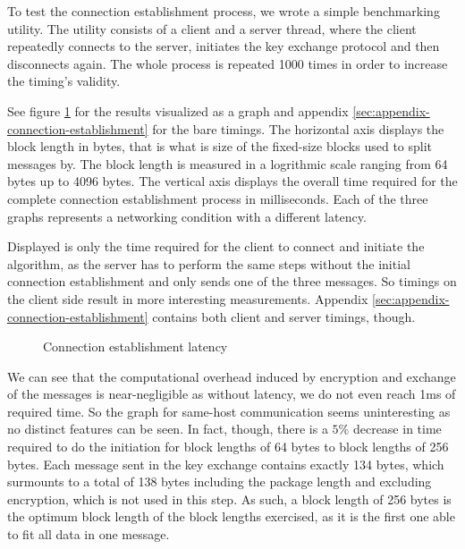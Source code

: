 To test the connection establishment process, we wrote a simple benchmarking utility.
The utility consists of a client and a server thread, where the client repeatedly connects to the server, initiates the key exchange protocol and then disconnects again.
The whole process is repeated 1000 times in order to increase the timing's validity.

See figure \ref{fig:connection-establishment} for the results visualized as a graph and appendix \ref{sec:appendix-connection-establishment} for the bare timings.
The horizontal axis displays the block length in bytes, that is what is size of the fixed-size blocks used to split messages by.
The block length is measured in a logrithmic scale ranging from 64 bytes up to 4096 bytes.
The vertical axis displays the overall time required for the complete connection establishment process in milliseconds.
Each of the three graphs represents a networking condition with a different latency.

Displayed is only the time required for the client to connect and initiate the algorithm, as the server has to perform the same steps without the initial connection establishment and only sends one of the three messages.
So timings on the client side result in more interesting measurements.
Appendix \ref{sec:appendix-connection-establishment} contains both client and server timings, though.

\begin{figure}[t]
    \centering
    \caption{Connection establishment latency}
    \label{fig:connection-establishment}
\end{figure}

We can see that the computational overhead induced by encryption and exchange of the messages is near-negligible as without latency, we do not even reach 1ms of required time.
So the graph for same-host communication seems uninteresting as no distinct features can be seen.
In fact, though, there is a $5\%$ decrease in time required to do the initiation for block lengths of 64 bytes to block lengths of 256 bytes.
Each message sent in the key exchange contains exactly 134 bytes, which surmounts to a total of 138 bytes including the package length and excluding encryption, which is not used in this step.
As such, a block length of 256 bytes is the optimum block length of the block lengths exercised, as it is the first one able to fit all data in one message.

